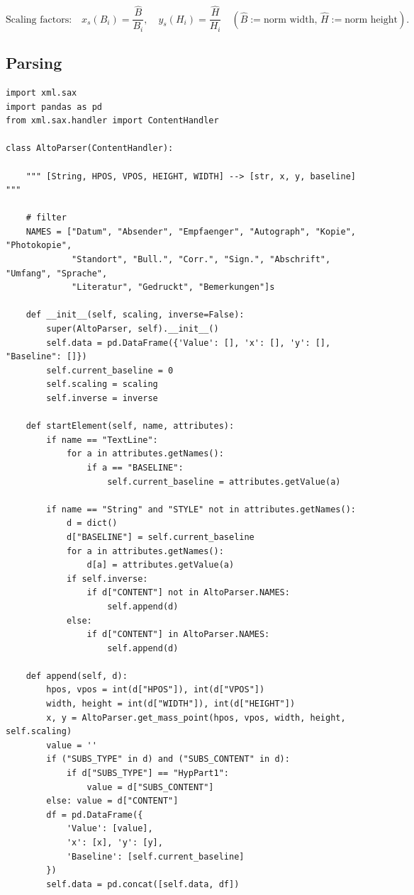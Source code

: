 \vspace*{-0.9cm}
\begin{footnotesize}
\begin{equation*}
\text{Scaling factors:}\quad
x_s (B_i) = \frac{\hat{B}}{B_i},\quad
y_s (H_i) = \frac{\hat{H}}{H_i}\quad
(\hat{B}:=\text{norm width},\,
\hat{H}:=\text{norm height}).
\end{equation*}
\end{footnotesize}


\subsection{Parsing}

\begin{lstlisting}
import xml.sax
import pandas as pd
from xml.sax.handler import ContentHandler

class AltoParser(ContentHandler):

    """ [String, HPOS, VPOS, HEIGHT, WIDTH] --> [str, x, y, baseline] """

    # filter
    NAMES = ["Datum", "Absender", "Empfaenger", "Autograph", "Kopie", "Photokopie",
             "Standort", "Bull.", "Corr.", "Sign.", "Abschrift", "Umfang", "Sprache",
             "Literatur", "Gedruckt", "Bemerkungen"]s

    def __init__(self, scaling, inverse=False):
        super(AltoParser, self).__init__()
        self.data = pd.DataFrame({'Value': [], 'x': [], 'y': [], "Baseline": []})
        self.current_baseline = 0
        self.scaling = scaling
        self.inverse = inverse

    def startElement(self, name, attributes):
        if name == "TextLine":
            for a in attributes.getNames():
                if a == "BASELINE":
                    self.current_baseline = attributes.getValue(a)

        if name == "String" and "STYLE" not in attributes.getNames():
            d = dict()
            d["BASELINE"] = self.current_baseline
            for a in attributes.getNames():
                d[a] = attributes.getValue(a)
            if self.inverse:
                if d["CONTENT"] not in AltoParser.NAMES:
                    self.append(d)
            else:
                if d["CONTENT"] in AltoParser.NAMES:
                    self.append(d)

    def append(self, d):
        hpos, vpos = int(d["HPOS"]), int(d["VPOS"])
        width, height = int(d["WIDTH"]), int(d["HEIGHT"])
        x, y = AltoParser.get_mass_point(hpos, vpos, width, height, self.scaling)
        value = ''
        if ("SUBS_TYPE" in d) and ("SUBS_CONTENT" in d):
            if d["SUBS_TYPE"] == "HypPart1":
                value = d["SUBS_CONTENT"]
        else: value = d["CONTENT"]
        df = pd.DataFrame({
            'Value': [value],
            'x': [x], 'y': [y],
            'Baseline': [self.current_baseline]
        })
        self.data = pd.concat([self.data, df])


\end{lstlisting}

